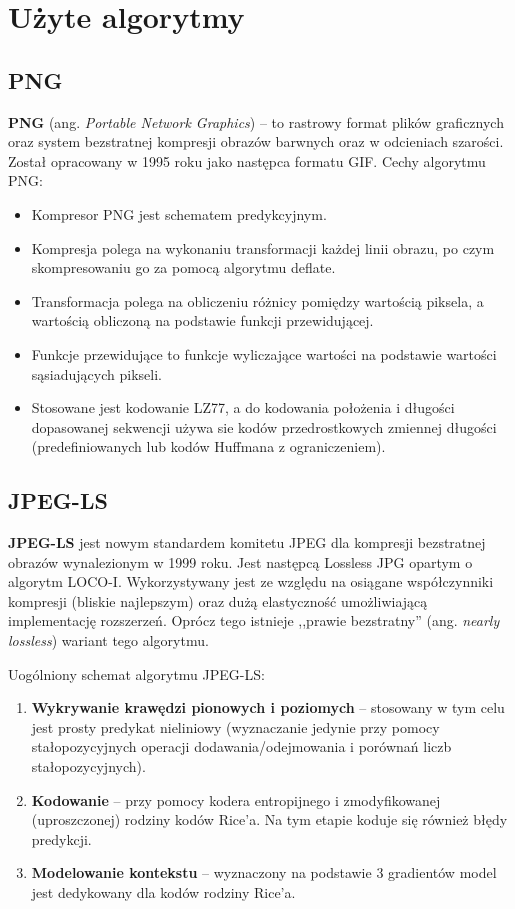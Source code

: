 \section{Użyte algorytmy}

\subsection{PNG}

\textbf{PNG} (ang. \textit{Portable Network Graphics}) -- to rastrowy format plików graficznych oraz system bezstratnej kompresji obrazów barwnych oraz w odcieniach szarości. Został opracowany w 1995 roku jako następca formatu GIF.
Cechy algorytmu PNG:

\begin{itemize}
	\item Kompresor PNG jest schematem predykcyjnym.
	\item Kompresja polega na wykonaniu transformacji każdej linii obrazu, po czym skompresowaniu go za pomocą algorytmu deflate.
	\item Transformacja polega na obliczeniu różnicy pomiędzy wartością piksela, a wartością obliczoną na podstawie funkcji przewidującej.
	\item Funkcje przewidujące to funkcje wyliczające wartości na podstawie wartości sąsiadujących pikseli.
	\item Stosowane jest kodowanie LZ77, a do kodowania położenia i długości dopasowanej sekwencji używa sie kodów przedrostkowych zmiennej długości (predefiniowanych lub kodów Huffmana z ograniczeniem).
\end{itemize}

\subsection{JPEG-LS}

\textbf{JPEG-LS} jest nowym standardem komitetu JPEG dla kompresji bezstratnej obrazów wynalezionym w 1999 roku. Jest następcą Lossless JPG opartym o algorytm LOCO-I. Wykorzystywany jest ze względu na osiągane współczynniki kompresji (bliskie najlepszym) oraz dużą elastyczność umożliwiającą implementację rozszerzeń. Oprócz tego istnieje ,,prawie bezstratny'' (ang. \textit{nearly lossless}) wariant tego algorytmu.

Uogólniony schemat algorytmu JPEG-LS:

\begin{enumerate}
	\item \textbf{Wykrywanie krawędzi pionowych i poziomych} -- stosowany w tym celu jest prosty predykat nieliniowy (wyznaczanie jedynie przy pomocy stałopozycyjnych operacji dodawania/odejmowania i porównań liczb stałopozycyjnych).
	\item \textbf{Kodowanie} -- przy pomocy kodera entropijnego i zmodyfikowanej (uproszczonej) rodziny kodów Rice'a. Na tym etapie koduje się również błędy predykcji.
	\item \textbf{Modelowanie kontekstu} -- wyznaczony na podstawie 3 gradientów model jest dedykowany dla kodów rodziny Rice'a.
\end{enumerate}

